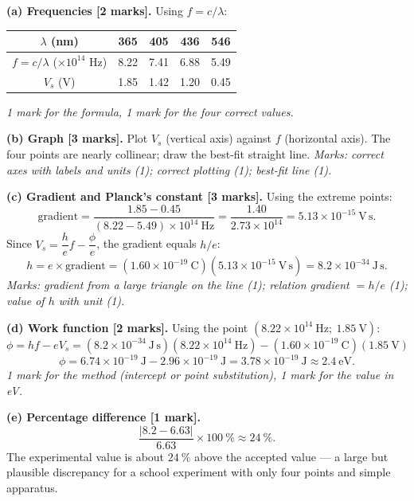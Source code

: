 \documentclass[11pt]{article}
\begin{document}
\begin{corrige}
\textbf{(a) Frequencies [2 marks].} Using $f = c/\lambda$:

\begin{center}
\begin{tabular}{|c|c|c|c|c|}
\hline
\rowcolor{popblueL} $\lambda$ (nm) & 365 & 405 & 436 & 546 \\
\hline
$f = c/\lambda$ ($\times 10^{14}$ Hz) & 8.22 & 7.41 & 6.88 & 5.49 \\
\hline
$V_s$ (V) & 1.85 & 1.42 & 1.20 & 0.45 \\
\hline
\end{tabular}
\end{center}
\emph{1 mark for the formula, 1 mark for the four correct values.}

\textbf{(b) Graph [3 marks].} Plot $V_s$ (vertical axis) against $f$ (horizontal axis). The four points are nearly collinear; draw the best-fit straight line. \emph{Marks: correct axes with labels and units (1); correct plotting (1); best-fit line (1).}

\textbf{(c) Gradient and Planck's constant [3 marks].} Using the extreme points:
\[ \text{gradient} = \frac{1.85 - 0.45}{(8.22 - 5.49)\times 10^{14}\ \mathrm{Hz}} = \frac{1.40}{2.73\times 10^{14}} = 5.13\times 10^{-15}\ \mathrm{V\,s}. \]
Since $V_s = \dfrac{h}{e}f - \dfrac{\phi}{e}$, the gradient equals $h/e$:
\[ h = e \times \text{gradient} = (1.60\times 10^{-19}\ \mathrm{C})(5.13\times 10^{-15}\ \mathrm{V\,s}) = 8.2\times 10^{-34}\ \mathrm{J\,s}. \]
\emph{Marks: gradient from a large triangle on the line (1); relation gradient $= h/e$ (1); value of $h$ with unit (1).}

\textbf{(d) Work function [2 marks].} Using the point $(8.22\times 10^{14}\ \mathrm{Hz};\ 1.85\ \mathrm{V})$:
\[ \phi = hf - eV_s = (8.2\times 10^{-34}\ \mathrm{J\,s})(8.22\times 10^{14}\ \mathrm{Hz}) - (1.60\times 10^{-19}\ \mathrm{C})(1.85\ \mathrm{V}) \]
\[ \phi = 6.74\times 10^{-19}\ \mathrm{J} - 2.96\times 10^{-19}\ \mathrm{J} = 3.78\times 10^{-19}\ \mathrm{J} \approx 2.4\ \mathrm{eV}. \]
\emph{1 mark for the method (intercept or point substitution), 1 mark for the value in eV.}

\textbf{(e) Percentage difference [1 mark].}
\[ \frac{|8.2 - 6.63|}{6.63}\times 100\ \% \approx 24\ \%. \]
The experimental value is about $24\ \%$ above the accepted value — a large but plausible discrepancy for a school experiment with only four points and simple apparatus.


\end{corrige}
\end{document}
